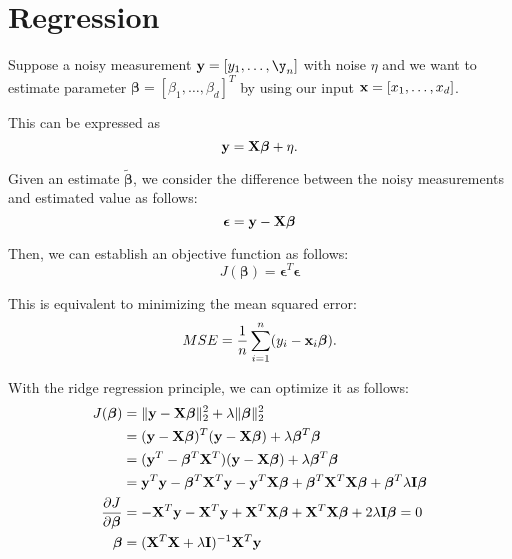 \section{Regression}
\label{sec:basic_regression}
Suppose a noisy measurement $\rvy = [y_1, \dots, \y_n]$ with noise $\eta$ and we want to estimate parameter $\boldsymbol{\beta} = [\beta_1,\dots,\beta_d]^T$ by using our input ${\mathbf{x}} = [x_1, \dots, x_d]$. 

This can be expressed as 
$${\mathbf{y}} = \mathbf{X}\boldsymbol{\beta}+\eta.$$

Given an estimate $\tilde{\boldsymbol{\beta}}$, we consider the difference between the noisy measurements and estimated value as follows:
$$\boldsymbol{\epsilon} = {\mathbf{y}} - \mathbf{X}\boldsymbol{\beta}$$

Then, we can establish an objective function as follows:
$$J(\boldsymbol{\beta}) = \boldsymbol{\epsilon}^T\boldsymbol{\epsilon}$$

This is equivalent to minimizing the mean squared error:
$$MSE = \frac{1}{n}\sum_{i=1}^n (y_i-{\mathbf{x}}_i\boldsymbol{\beta}).$$


With the ridge regression principle, we can optimize it as follows:
\begin{align}
	J(\boldsymbol{\beta}) &= \|\mathbf{y}-\mathbf{X}\boldsymbol{\beta}\|^2_2 + \lambda \|\boldsymbol{\beta}\|^2_2 \\
			&= (\mathbf{y}-\mathbf{X}\boldsymbol{\beta})^T(\mathbf{y}-\mathbf{X}\boldsymbol{\beta})+\lambda\boldsymbol{\beta}^T\boldsymbol{\beta}\\
			&= (\mathbf{y}^T-\boldsymbol{\beta}^T\mathbf{X}^T)(\mathbf{y}-\mathbf{X}\boldsymbol{\beta})+\lambda\boldsymbol{\beta}^T\boldsymbol{\beta}\\
			&= {\mathbf{y}}^T{\mathbf{y}}-\boldsymbol{\beta}^T\mathbf{X}^T{\mathbf{y}}-{\mathbf{y}}^T\mathbf{X}\boldsymbol{\beta}+\boldsymbol{\beta}^T\mathbf{X}^T\mathbf{X}\boldsymbol{\beta}+\boldsymbol{\beta}^T\lambda\mathbf{I}\boldsymbol{\beta}\\
	\frac{\partial J}{\partial \boldsymbol{\beta}}&= -\mathbf{X}^T{\mathbf{y}}-\mathbf{X}^T{\mathbf{y}}+\mathbf{X}^T\mathbf{X}\boldsymbol{\beta}+\mathbf{X}^T\mathbf{X}\boldsymbol{\beta}+2\lambda\mathbf{I}\boldsymbol{\beta} = 0\\
	\boldsymbol{\beta}	&= (\mathbf{X}^T\mathbf{X}+\lambda\mathbf{I})^{-1}\mathbf{X}^T{\mathbf{y}}
	\label{eq:ridge_regression}
\end{align}

